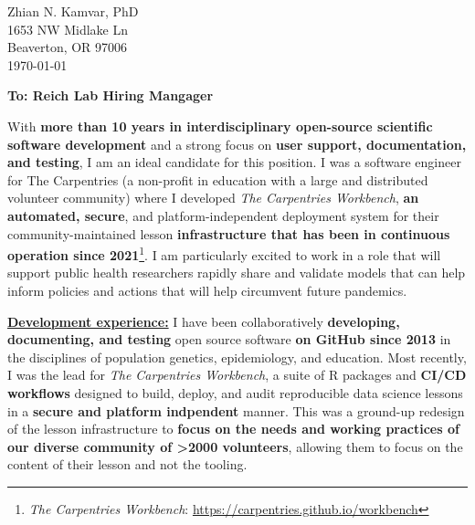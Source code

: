 


\clearpage
\begin{flushright}
  Zhian N. Kamvar, PhD\\
  1653 NW Midlake Ln\\
  Beaverton, OR 97006\\
  \today
\end{flushright}

\textbf{To: Reich Lab Hiring Mangager}\\

\vspace{2ex}

With \textbf{more than 10 years in interdisciplinary open-source scientific software development} and a strong focus on \textbf{user support, documentation, and testing}, I am an ideal candidate for this position. 
I was a software engineer for The Carpentries (a non-profit in education with a large and distributed volunteer community) where I developed \textit{The Carpentries Workbench}, \textbf{an automated, secure}, and platform-independent deployment system for their community-maintained lesson \textbf{infrastructure that has been in continuous operation since 2021}\footnote{\textit{The Carpentries Workbench}: \url{https://carpentries.github.io/workbench}}.
I am particularly excited to work in a role that will support public health
researchers rapidly share and validate models that can help inform policies
and actions that will help circumvent future pandemics.



\vspace{2ex}

\underline{\textbf{Development experience:}}
I have been collaboratively \textbf{developing, documenting, and testing} open source software \textbf{on GitHub since 2013} in the disciplines of population genetics, epidemiology, and education.
Most recently, I was the lead for \textit{The Carpentries Workbench}, 
a suite of R packages and \textbf{CI/CD workflows} designed to build, deploy, and audit reproducible data science lessons in a \textbf{secure and platform indpendent} manner.
This was a ground-up redesign of the lesson infrastructure to \textbf{focus on
the needs and working practices of our diverse community of \textgreater2000 volunteers},
allowing them to focus on the content of their lesson and not the tooling.

